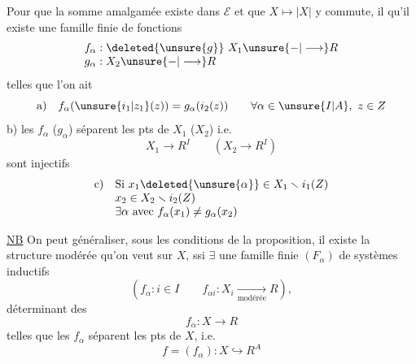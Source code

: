 Pour que la somme amalgamée existe dans  $\mathcal E$ et que $X\mapsto|X|$ y commute, il  qu'il existe une famille finie de  fonctions
\[
\begin{array}{l}
f_\alpha:\deleted{\unsure{g}}\ X_1\unsure{-|\longrightarrow}R\\
g_\alpha:X_2\unsure{-|\longrightarrow}R
\end{array}
\]
telles que l'on ait
\[
\text{a)}\quad f_\alpha(\unsure{i_1|z_1}(z))=g_\alpha(i_2(z))\qquad\forall\alpha\in\unsure{I|A},\ z\in Z
\]
b)  les $f_\alpha$ ($g_\alpha$) séparent  les pts de $X_1$ ($X_2$) i.e.
\[
 X_1\longrightarrow R^I\qquad(X_2\longrightarrow R^I)
\]
sont injectifs
\[
\begin{array}{ll}
\text{c)}&\text{Si }x_1\deleted{\unsure{\alpha}}\in X_1\smallsetminus i_1(Z)\\
&x_2\in X_2\smallsetminus i_2(Z)\\
&\exists\alpha\text{ avec }f_\alpha(x_1)\ne g_\alpha(x_2)
\end{array}
\]

\uline{NB} On peut généraliser, sous les conditions de la proposition, il existe la structure modérée qu'on veut sur $X$, ssi $\exists$ une famille finie $(F_\alpha)$  de systèmes inductifs
\[
 (f_\alpha:i\in I\qquad f_{\alpha i}:X_i\underset{\text{modérée}}{\longrightarrow}R),
\]
déterminant des
\[
 f_\alpha:X\longrightarrow R
\]
telles que les $f_\alpha$ séparent les pts de $X$, i.e.
\[
 f=(f_\alpha):X\hookrightarrow R^A
\]
